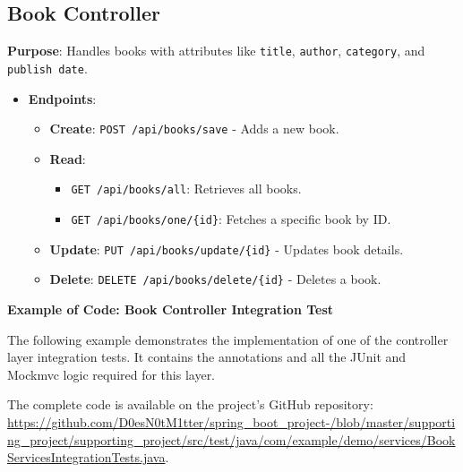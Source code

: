 \documentclass[a4paper,12pt]{article}
\begin{document}
\subsection{Book Controller}
\textbf{Purpose}: Handles books with attributes like \texttt{title}, \texttt{author}, \texttt{category}, and \texttt{publish date}.
\begin{itemize}
    \item \textbf{Endpoints}:
    \begin{itemize}
        \item \textbf{Create}: \texttt{POST /api/books/save} - Adds a new book.
        \item \textbf{Read}:
        \begin{itemize}
            \item \texttt{GET /api/books/all}: Retrieves all books.
            \item \texttt{GET /api/books/one/\{id\}}: Fetches a specific book by ID.
        \end{itemize}
        \item \textbf{Update}: \texttt{PUT /api/books/update/\{id\}} - Updates book details.
        \item \textbf{Delete}: \texttt{DELETE /api/books/delete/\{id\}} - Deletes a book.
    \end{itemize}
\end{itemize}

\textbf{Example of Code: Book Controller Integration Test}

The following example demonstrates the implementation of one of the controller layer integration tests.
It contains the annotations and all the JUnit and Mockmvc logic required for this layer.

The complete code is available on the project's GitHub repository: 
\hspace{5}\\

\url{https://github.com/D0esN0tM1tter/spring_boot_project-/blob/master/supporting_project/supporting_project/src/test/java/com/example/demo/services/BookServicesIntegrationTests.java}.
\end{document}
